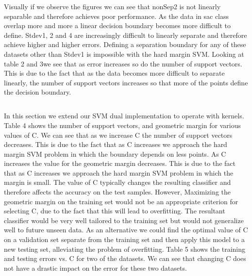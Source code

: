 \documentclass[pageno]{jpaper}
\begin{document}
Visually if we observe the figures we can see that nonSep2 is not linearly separable and therefore achieves poor performance. As the data in sac class overlap more and more a linear decision boundary becomes more difficult to define. Stdev1, 2 and 4 are increasingly difficult to linearly separate and therefore achieve higher and higher errors.  Defining a separation boundary for any of these datasets other than Stdev1 is impossible with the hard margin SVM. Looking at table 2 and 3we see that as error increases so do the number of support vectors. This is due to the fact that as the data becomes more difficult to separate linearly, the number of support vectors increases so that more of the points define the decision boundary.

\subsection{}
In this section we extend our SVM dual implementation to operate with kernels. Table 4 shows the number of support vectors, and geometric margin for various values of C. We can see that as we increase C the number of support vectors decreases. This is due to the fact that as C increases we approach the hard margin SVM problem in which the boundary depends on less points. As C increases the value for the geometric margin decreases. This is due to the fact that as C increases we approach the hard margin SVM problem in which the margin is small. The value of C typically changes the resulting classifier and therefore affects the accuracy on the test samples. However, Maximizing the geometric margin on the training set would not be an appropriate criterion for selecting C, due to the fact that this will lead to overfitting. The resultant classifier would be very well tailored to the training set but would not generalize well to future unseen data. As an alternative we could find the optimal value of C on a validation set separate from the training set and then apply this model to a new testing set, alleviating the problem of overfitting. 
Table 5 shows the training and testing errors vs. C for two of the datasets. We can see that changing C does not have a drastic impact on the error for these two datasets.
\end{document}
